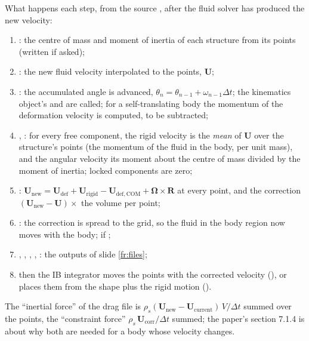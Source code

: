 \documentclass[aspectratio=169,11pt]{beamer}
\begin{document}
\begin{frame}{What happens each step, from the source}
\label{fr:step}
\footnotesize {}, after the fluid solver has produced the new velocity:
\begin{enumerate}\scriptsize
  \item {}: the centre of mass and moment of inertia of each structure from its points (written if asked);
  \item {}: the new fluid velocity interpolated to the points, $\mathbf{U}$;
  \item {}: the accumulated angle is advanced, $\theta_{n} = \theta_{n-1} + \omega_{n-1}\Delta t$; the kinematics object's  and  are called; for a self-translating body the momentum of the deformation velocity is computed, to be subtracted;
  \item {}, : for every free component, the rigid velocity is the \emph{mean} of $\mathbf{U}$ over the structure's points (the momentum of the fluid in the body, per unit mass), and the angular velocity its moment about the centre of mass divided by the moment of inertia; locked components are zero;
  \item {}: $\mathbf{U}_{\mathrm{new}} = \mathbf{U}_{\mathrm{def}} + \mathbf{U}_{\mathrm{rigid}} - \mathbf{U}_{\mathrm{def,COM}} + \boldsymbol{\Omega}\times\mathbf{R}$ at every point, and the correction $(\mathbf{U}_{\mathrm{new}} - \mathbf{U})\times$ the volume per point;
  \item {}: the correction is spread to the grid, so the fluid in the body region now moves with the body;  if ;
  \item {}, , , , : the outputs of slide \ref{fr:files};
  \item then the IB integrator moves the points with the corrected velocity (), or places them from the shape plus the rigid motion ().
\end{enumerate}
\scriptsize The ``inertial force'' of the drag file is $\rho_s(\mathbf{U}_{\mathrm{new}} - \mathbf{U}_{\mathrm{current}})\,V/\Delta t$ summed over the points, the ``constraint force'' $\rho_s\,\mathbf{U}_{\mathrm{corr}}/\Delta t$ summed; the paper's section 7.1.4 is about why both are needed for a body whose velocity changes.
\end{frame}
\end{document}
